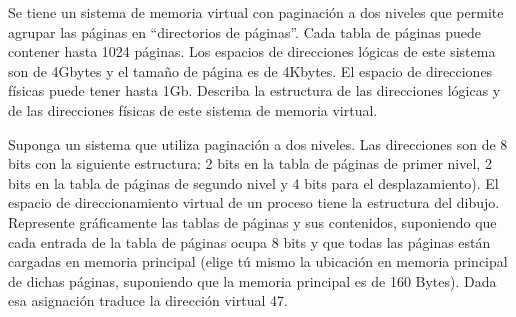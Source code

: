 \begin{ejercicio}
    Se tiene un sistema de memoria virtual con paginación a dos niveles que permite
agrupar las páginas en “directorios de páginas”. Cada tabla de páginas puede contener
hasta 1024 páginas. Los espacios de direcciones lógicas de este sistema son de
4Gbytes y el tamaño de página es de 4Kbytes. El espacio de direcciones físicas puede
tener hasta 1Gb. Describa la estructura de las direcciones lógicas y de las direcciones
físicas de este sistema de memoria virtual.
\end{ejercicio}


\begin{ejercicio}
    Suponga un sistema que utiliza paginación a dos niveles. Las direcciones son de 8 bits
con la siguiente estructura: 2 bits en la tabla de páginas de primer nivel, 2 bits en la tabla
de páginas de segundo nivel y 4 bits para el desplazamiento). El espacio de
direccionamiento virtual de un proceso tiene la estructura del dibujo. Represente
gráficamente las tablas de páginas y sus contenidos, suponiendo que cada entrada de la
tabla de páginas ocupa 8 bits y que todas las páginas están cargadas en memoria
principal (elige tú mismo la ubicación en memoria principal de dichas páginas,
suponiendo que la memoria principal es de 160 Bytes). Dada esa asignación traduce la
dirección virtual 47.
\begin{figure}[H]
    \centering
\end{figure}
\end{ejercicio}


